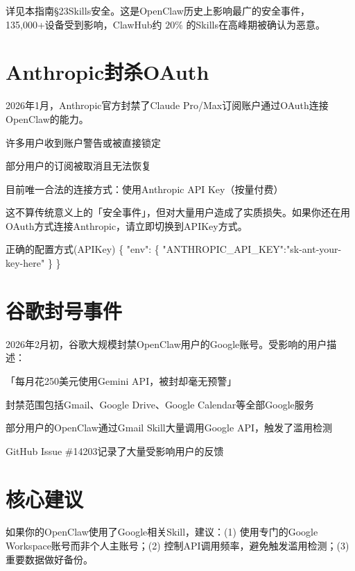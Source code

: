 \documentclass[
  10
]{article}
\newenvironment{Shaded}{}{}
\newcommand{\NormalTok}[1]{#1}
\begin{document}
详见本指南§23Skills安全。这是OpenClaw历史上影响最广的安全事件，135,000+设备受到影响，ClawHub约
\(2 0 \%\) 的Skills在高峰期被确认为恶意。

\section{Anthropic封杀OAuth}\label{anthropicux5c01ux6740oauth}

2026年1月，Anthropic官方封禁了Claude
Pro/Max订阅账户通过OAuth连接OpenClaw的能力。

许多用户收到账户警告或被直接锁定

部分用户的订阅被取消且无法恢复

目前唯一合法的连接方式：使用Anthropic API Key（按量付费）

这不算传统意义上的「安全事件」，但对大量用户造成了实质损失。如果你还在用OAuth方式连接Anthropic，请立即切换到APIKey方式。

\begin{Shaded}
\begin{Highlighting}[]
\NormalTok{正确的配置方式(APIKey)   }
\NormalTok{\{ "env": \{ "ANTHROPIC\_API\_KEY":"sk{-}ant{-}your{-}key{-}here" \}   }
\NormalTok{\}}
\end{Highlighting}
\end{Shaded}

\section{谷歌封号事件}\label{ux8c37ux6b4cux5c01ux53f7ux4e8bux4ef6}

2026年2月初，谷歌大规模封禁OpenClaw用户的Google账号。受影响的用户描述：

「每月花250美元使用Gemini API，被封却毫无预警」

封禁范围包括Gmail、Google Drive、Google Calendar等全部Google服务

部分用户的OpenClaw通过Gmail Skill大量调用Google API，触发了滥用检测

GitHub Issue \#14203记录了大量受影响用户的反馈

\section{核心建议}\label{ux6838ux5fc3ux5efaux8bae-20}

如果你的OpenClaw使用了Google相关Skill，建议：(1) 使用专门的Google
Workspace账号而非个人主账号；(2) 控制API调用频率，避免触发滥用检测；(3)
重要数据做好备份。
\end{document}
